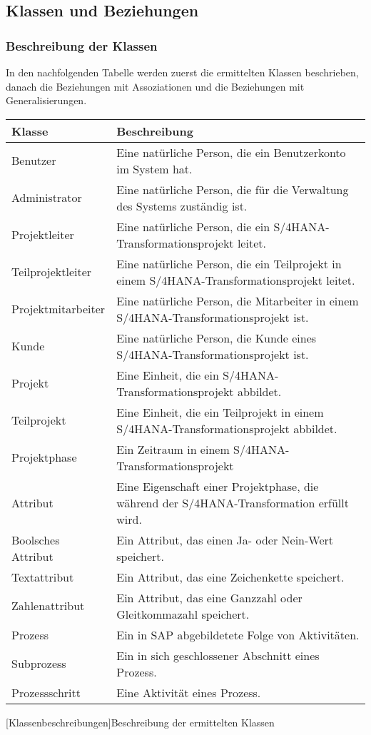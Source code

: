 \newpage
\subsection{Klassen und Beziehungen}
\subsubsection{Beschreibung der Klassen}
In den nachfolgenden Tabelle werden zuerst die ermittelten Klassen beschrieben, danach die Beziehungen mit Assoziationen und die Beziehungen mit Generalisierungen.

\begin{xltabular}{\textwidth}{|p{0.3\textwidth}|p{0.642\textwidth}|}
    \hline
    \textbf{Klasse} & \textbf{Beschreibung} \\\hline\hline
    Benutzer & Eine natürliche Person, die ein Benutzerkonto im System hat.\\\hline
    Administrator & Eine natürliche Person, die für die Verwaltung des Systems zuständig ist. \\\hline
    Projektleiter & Eine natürliche Person, die ein S/4HANA-Transformationsprojekt leitet. \\\hline
    Teilprojektleiter & Eine natürliche Person, die ein Teilprojekt in einem S/4HANA-Transformationsprojekt leitet. \\\hline
    Projektmitarbeiter & Eine natürliche Person, die Mitarbeiter in einem S/4HANA-Transformationsprojekt ist. \\\hline
    Kunde &  Eine natürliche Person, die Kunde eines S/4HANA-Transformationsprojekt ist.\\\hline
    Projekt & Eine Einheit, die ein S/4HANA-Transformationsprojekt abbildet. \\\hline
    Teilprojekt & Eine Einheit, die ein Teilprojekt in einem S/4HANA-Transformationsprojekt abbildet. \\\hline
    Projektphase & Ein Zeitraum in einem S/4HANA-Transformationsprojekt\\\hline
    Attribut & Eine Eigenschaft einer Projektphase, die während der S/4HANA-Transformation erfüllt wird. \\\hline
    Boolsches Attribut & Ein Attribut, das einen Ja- oder Nein-Wert speichert.\\\hline
    Textattribut & Ein Attribut, das eine Zeichenkette speichert.\\\hline
    Zahlenattribut & Ein Attribut, das eine Ganzzahl oder Gleitkommazahl speichert. \\\hline
    Prozess &  Ein in SAP abgebildetete Folge von Aktivitäten.\\\hline
    Subprozess &  Ein in sich geschlossener Abschnitt eines Prozess.\\\hline
    Prozessschritt & Eine Aktivität eines Prozess.\\\hline
\end{xltabular}
[Klassenbeschreibungen]{Beschreibung der ermittelten Klassen}

